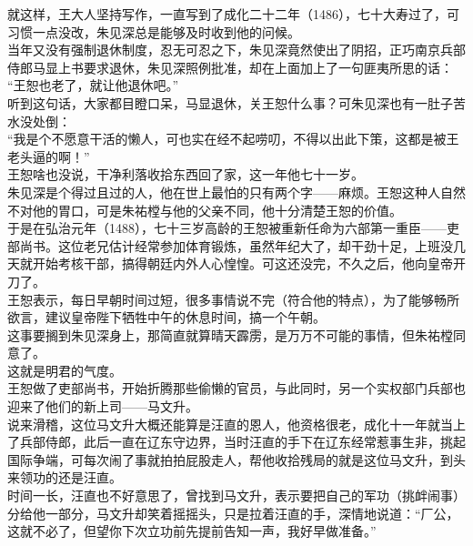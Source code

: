 \begin{multicols}{\theparacolNo}
就这样，王大人坚持写作，一直写到了成化二十二年（1486），七十大寿过了，可习惯一点没改，朱见深总是能够及时收到他的问候。\\

当年又没有强制退休制度，忍无可忍之下，朱见深竟然使出了阴招，正巧南京兵部侍郎马显上书要求退休，朱见深照例批准，却在上面加上了一句匪夷所思的话：\\

“王恕也老了，就让他退休吧。”\\

听到这句话，大家都目瞪口呆，马显退休，关王恕什么事？可朱见深也有一肚子苦水没处倒：\\

“我是个不愿意干活的懒人，可也实在经不起唠叨，不得以出此下策，这都是被王老头逼的啊！”\\

王恕啥也没说，干净利落收拾东西回了家，这一年他七十一岁。\\

朱见深是个得过且过的人，他在世上最怕的只有两个字——麻烦。王恕这种人自然不对他的胃口，可是朱祐樘与他的父亲不同，他十分清楚王恕的价值。\\

于是在弘治元年（1488），七十三岁高龄的王恕被重新任命为六部第一重臣——吏部尚书。这位老兄估计经常参加体育锻炼，虽然年纪大了，却干劲十足，上班没几天就开始考核干部，搞得朝廷内外人心惶惶。可这还没完，不久之后，他向皇帝开刀了。\\

王恕表示，每日早朝时间过短，很多事情说不完（符合他的特点），为了能够畅所欲言，建议皇帝陛下牺牲中午的休息时间，搞一个午朝。\\

这事要搁到朱见深身上，那简直就算晴天霹雳，是万万不可能的事情，但朱祐樘同意了。\\

这就是明君的气度。\\

王恕做了吏部尚书，开始折腾那些偷懒的官员，与此同时，另一个实权部门兵部也迎来了他们的新上司——马文升。\\

说来滑稽，这位马文升大概还能算是汪直的恩人，他资格很老，成化十一年就当上了兵部侍郎，此后一直在辽东守边界，当时汪直的手下在辽东经常惹事生非，挑起国际争端，可每次闹了事就拍拍屁股走人，帮他收拾残局的就是这位马文升，到头来领功的还是汪直。\\

时间一长，汪直也不好意思了，曾找到马文升，表示要把自己的军功（挑衅闹事）分给他一部分，马文升却笑着摇摇头，只是拉着汪直的手，深情地说道：“厂公，这就不必了，但望你下次立功前先提前告知一声，我好早做准备。”\\


\end{multicols}
